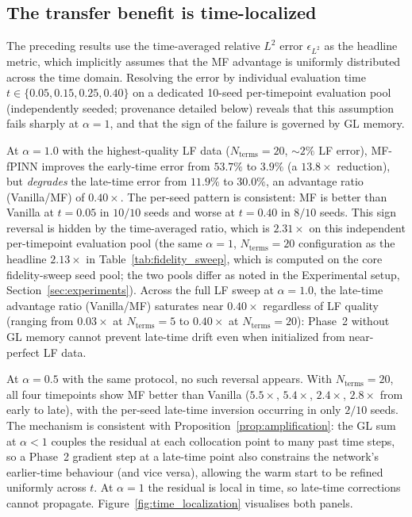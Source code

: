 \documentclass[11pt]{article}
\begin{document}
\subsection{The transfer benefit is time-localized}
\label{sec:time_localization}

The preceding results use the time-averaged relative $L^2$ error $\epsilon_{L^2}$ as the headline metric, which implicitly assumes that the MF advantage is uniformly distributed across the time domain. Resolving the error by individual evaluation time $t \in \{0.05, 0.15, 0.25, 0.40\}$ on a dedicated 10-seed per-timepoint evaluation pool (independently seeded; provenance detailed below) reveals that this assumption fails sharply at $\alpha = 1$, and that the sign of the failure is governed by GL memory.

At $\alpha = 1.0$ with the highest-quality LF data ($N_{\mathrm{terms}} = 20$, ${\sim}2\%$ LF error), MF-fPINN improves the early-time error from $53.7\%$ to $3.9\%$ (a $13.8\times$ reduction), but \emph{degrades} the late-time error from $11.9\%$ to $30.0\%$, an advantage ratio (Vanilla/MF) of $0.40\times$. The per-seed pattern is consistent: MF is better than Vanilla at $t = 0.05$ in $10/10$ seeds and worse at $t = 0.40$ in $8/10$ seeds. This sign reversal is hidden by the time-averaged ratio, which is $2.31\times$ on this independent per-timepoint evaluation pool (the same $\alpha = 1$, $N_{\mathrm{terms}} = 20$ configuration as the headline $2.13\times$ in Table~\ref{tab:fidelity_sweep}, which is computed on the core fidelity-sweep seed pool; the two pools differ as noted in the Experimental setup, Section~\ref{sec:experiments}). Across the full LF sweep at $\alpha = 1.0$, the late-time advantage ratio (Vanilla/MF) saturates near $0.40\times$ regardless of LF quality (ranging from $0.03\times$ at $N_{\mathrm{terms}} = 5$ to $0.40\times$ at $N_{\mathrm{terms}} = 20$): Phase~2 without GL memory cannot prevent late-time drift even when initialized from near-perfect LF data.

At $\alpha = 0.5$ with the same protocol, no such reversal appears. With $N_{\mathrm{terms}} = 20$, all four timepoints show MF better than Vanilla ($5.5\times$, $5.4\times$, $2.4\times$, $2.8\times$ from early to late), with the per-seed late-time inversion occurring in only $2/10$ seeds. The mechanism is consistent with Proposition~\ref{prop:amplification}: the GL sum at $\alpha < 1$ couples the residual at each collocation point to many past time steps, so a Phase~2 gradient step at a late-time point also constrains the network's earlier-time behaviour (and vice versa), allowing the warm start to be refined uniformly across $t$. At $\alpha = 1$ the residual is local in time, so late-time corrections cannot propagate. Figure~\ref{fig:time_localization} visualises both panels.
\end{document}
